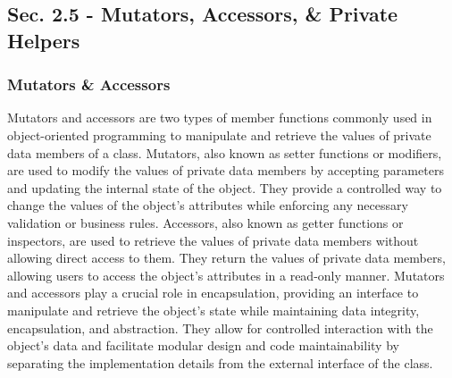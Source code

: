 \subsection*{Sec. 2.5 - Mutators, Accessors, \& Private Helpers}
\subsubsection*{Mutators \& Accessors}

Mutators and accessors are two types of member functions commonly used in object-oriented programming to manipulate and retrieve the values of private data members of a class. Mutators, also known as setter functions or 
modifiers, are used to modify the values of private data members by accepting parameters and updating the internal state of the object. They provide a controlled way to change the values of the object's attributes while 
enforcing any necessary validation or business rules. Accessors, also known as getter functions or inspectors, are used to retrieve the values of private data members without allowing direct access to them. They return 
the values of private data members, allowing users to access the object's attributes in a read-only manner. Mutators and accessors play a crucial role in encapsulation, providing an interface to manipulate and retrieve 
the object's state while maintaining data integrity, encapsulation, and abstraction. They allow for controlled interaction with the object's data and facilitate modular design and code maintainability by separating the 
implementation details from the external interface of the class. \\

